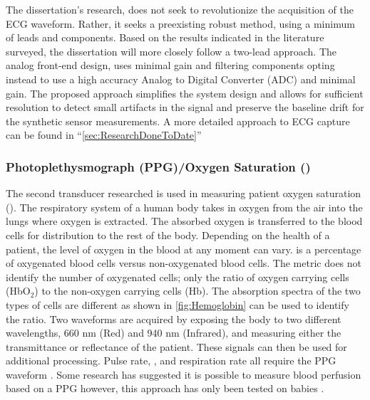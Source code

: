 The dissertation's research, does not seek to revolutionize the acquisition of the ECG waveform. Rather, it seeks a preexisting robust method, using a minimum of leads and components. Based on the results indicated in the literature surveyed, the dissertation will more closely follow a two-lead approach. The analog front-end design, uses minimal gain and filtering components opting instead to use a high accuracy Analog to Digital Converter (ADC) and minimal gain. The proposed approach simplifies the system design and allows for sufficient resolution to detect small artifacts in the signal and preserve the baseline drift for the synthetic sensor measurements. A more detailed approach to ECG capture can be found in ``\cref{sec:ResearchDoneToDate}''



\subsubsection{Photoplethysmograph (PPG)/Oxygen Saturation ()}

\label{subsubsec:Photoplethysmograph}
The second transducer researched is used in measuring patient oxygen saturation (). The respiratory system of a human body takes in oxygen from the air into the lungs where oxygen is extracted. The absorbed oxygen is transferred to the blood cells for distribution to the rest of the body. Depending on the health of a patient, the level of oxygen in the blood at any moment can vary.  is a percentage of oxygenated blood cells versus non-oxygenated blood cells. The  metric does not identify the number of oxygenated cells; only the ratio of oxygen carrying cells (HbO$_2$) to the non-oxygen carrying cells (Hb). The absorption spectra of the two types of cells are different as shown in \cref{fig:Hemoglobin}\cite{Prahl1998} can be used to identify the ratio. Two waveforms are acquired by exposing the body to two different wavelengths, 660 nm (Red) and 940 nm (Infrared), and measuring either the transmittance or reflectance of the patient. These signals can then be used for additional processing. Pulse rate, , and respiration rate all require the PPG waveform \cite{Scully2012,Kraitl2011}.  Some research has suggested it is possible to measure blood perfusion based on a PPG however, this approach has only been tested on babies \cite{Noor2011}.


